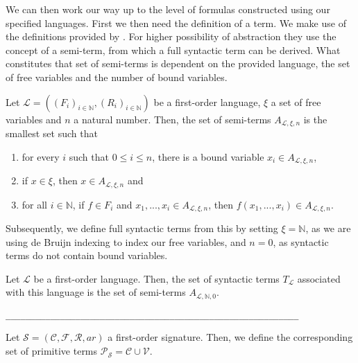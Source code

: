 We can then work our way up to the level of formulas constructed using our specified languages. First we then need the definition of a term. We make use of the definitions provided by \cite{ffl}. For higher possibility of abstraction they use the concept of a semi-term, from which a full syntactic term can be derived. What constitutes that set of semi-terms is dependent on the provided language, the set of free variables and the number of bound variables.

\begin{definition}\label{def:semi-term}
    \leanok
    Let $\mathcal{L} = ((F_i)_{i \in \mathbb{N}},(R_i)_{i \in \mathbb{N}})$ be a first-order language, $\xi$ a set of free variables and $n$ a natural number. Then, the set of semi-terms $A_{\mathcal{L},\xi,n}$ is the smallest set such that
    \begin{enumerate}
        \item for every $i$ such that $0 \leq i \leq n$, there is a bound variable $x_i \in A_{\mathcal{L},\xi,n}$,
        \item if $x \in \xi$, then $x \in A_{\mathcal{L},\xi,n}$ and
        \item for all $i \in \mathbb{N}$, if $f \in F_i$ and $x_1,...,x_i \in A_{\mathcal{L},\xi,n}$, then $f(x_1,...,x_i) \in A_{\mathcal{L},\xi,n}$.
    \end{enumerate}
\end{definition}

Subsequently, we define full syntactic terms from this by setting $\xi = \mathbb{N}$, as we are using de Bruijn indexing to index our free variables, and $n = 0$, as syntactic terms do not contain bound variables.

\begin{definition}\label{def:syntacticterm}
    \leanok
    Let $\mathcal{L}$ be a first-order language. Then, the set of syntactic terms $T_{\mathcal{L}}$ associated with this language is the set of semi-terms $A_{\mathcal{L},\mathbb{N},0}$. 
\end{definition}

\verb|___________________________________________________________|

\begin{definition}\label{def:primitive-term}
    Let $\mathcal{S} = (\mathcal{C},\mathcal{F},\mathcal{R},ar)$ a first-order signature. Then, we define the corresponding set of primitive terms $\mathcal{P}_{\mathcal{S}} = \mathcal{C} \cup \mathcal{V}$.
\end{definition}

